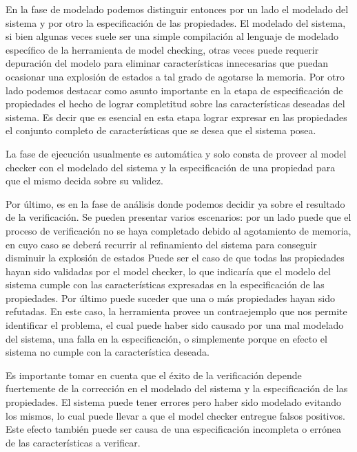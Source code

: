 \documentclass[pdftex,a4paper,12pt]{book}
\begin{document}
En la fase de modelado podemos distinguir entonces por un lado el modelado del sistema y por otro la especificaci\'on de las propiedades. El modelado del sistema, si bien algunas veces suele ser una simple compilaci\'on al lenguaje de modelado espec\'ifico de la herramienta de model checking, otras veces puede requerir depuraci\'on del modelo para eliminar caracter\'isticas innecesarias que puedan ocasionar una explosi\'on de estados a tal grado de agotarse la memoria. Por otro lado podemos destacar como asunto importante en la etapa de especificaci\'on de propiedades el hecho de lograr completitud sobre las caracter\'isticas deseadas del sistema. Es decir que es esencial en esta etapa lograr expresar en las propiedades el conjunto completo de caracter\'isticas que se desea que el sistema posea.

La fase de ejecuci\'on usualmente es autom\'atica y solo consta de proveer al model checker con el modelado del sistema y la especificaci\'on de una propiedad para que el mismo decida sobre su validez.

Por \'ultimo, es en la fase de an\'alisis donde podemos decidir ya sobre el resultado de la verificaci\'on. Se pueden presentar varios escenarios: por un lado puede que el proceso de verificaci\'on no se haya completado debido al agotamiento de memoria, en cuyo caso se deber\'a recurrir al refinamiento del sistema para conseguir disminuir la explosi\'on de estados%
Puede ser el caso de que todas las propiedades hayan sido validadas por el model checker, lo que indicar\'ia que el modelo del sistema cumple con las caracter\'isticas expresadas en la especificaci\'on de las propiedades. Por \'ultimo puede suceder que una o m\'as propiedades hayan sido refutadas. En este caso, la herramienta provee un contraejemplo que nos permite identificar el problema, el cual puede haber sido causado por una mal modelado del sistema, una falla en la especificaci\'on, o simplemente porque en efecto el sistema no cumple con la caracter\'istica deseada.

Es importante tomar en cuenta que el \'exito de la verificaci\'on depende fuertemente de la correcci\'on en el modelado del sistema y la especificaci\'on de las propiedades. El sistema puede tener errores pero haber sido modelado evitando los mismos, lo cual puede llevar a que el model checker entregue falsos positivos. Este efecto tambi\'en puede ser causa de una especificaci\'on incompleta o err\'onea de las caracter\'isticas a verificar.
\end{document}
